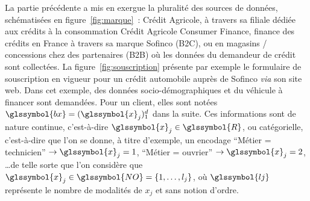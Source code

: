 La partie précédente a mis en exergue la pluralité des sources de données, schématisées en figure~\ref{fig:marque}~: Crédit Agricole, à travers sa filiale dédiée aux crédits à la consommation Crédit Agricole Consumer Finance, finance des crédits en France à travers sa marque Sofinco (B2C), ou en magasins / concessions chez des partenaires (B2B) où les données du demandeur de crédit sont collectées. La figure~\ref{fig:souscription} présente par exemple le formulaire de souscription en vigueur pour un crédit automobile auprès de Sofinco \textit{via} son site web. Dans cet exemple, des données socio-démographiques et du véhicule à financer sont demandées. Pour un client, elles sont notées $\glssymbol{bx} = (\glssymbol{x}_j)_1^d$ dans la suite. Ces informations sont de nature continue, c'est-à-dire $\glssymbol{x}_j \in \glssymbol{R}$, ou catégorielle, c'est-à-dire que l'on se donne, à titre d'exemple, un encodage ``Métier = technicien'' $\rightarrow \glssymbol{x}_j = 1$, ``Métier = ouvrier'' $\rightarrow \glssymbol{x}_j = 2$, \dots de telle sorte que l'on considère que $\glssymbol{x}_j \in \glssymbol{NO} = \{1, \dots,l_j\}$, où $\glssymbol{lj}$ représente le nombre de modalités de $x_j$ et sans notion d'ordre. 

